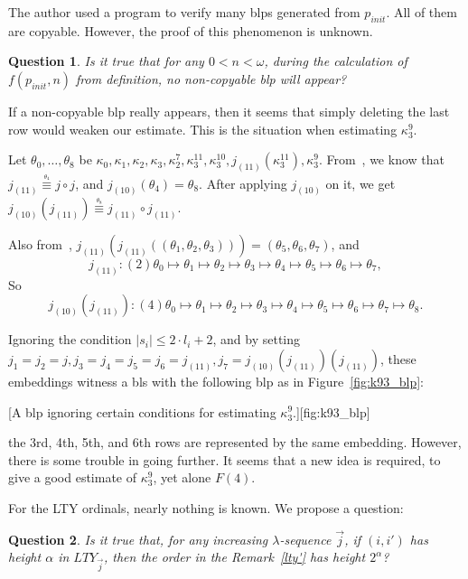 \documentclass{article}
\newtheorem{question}{Question}
\theoremstyle{definition}
\theoremstyle{remark}
\begin{document}
The author used a program to verify many blps generated from $p_{init}$. All of them are copyable. However, the proof of this phenomenon is unknown.

\begin{question}
    Is it true that for any $0<n<\omega$, during the calculation of $f(p_{init},n)$ from definition, no non-copyable blp will appear?
\end{question}

If a non-copyable blp really appears, then it seems that simply deleting the last row would weaken our estimate. This is the situation when estimating $\kappa^9_3$.

Let $\theta_0,\dots,\theta_8$ be $\kappa_0,\kappa_1,\kappa_2,\kappa_3,\kappa^7_2,\kappa^{11}_{3},\kappa^{10}_{3},j_{(11)}(\kappa^{11}_3),\kappa^9_3$. From~\cite{Dougherty}, we know that $j_{(11)}\overset{\underset{\theta_4}{}}{\equiv} j\circ j$, and $j_{(10)}(\theta_4)=\theta_8$. After applying $j_{(10)}$ on it, we get $j_{(10)}(j_{(11)})\overset{\underset{\theta_8}{}}{\equiv} j_{(11)}\circ j_{(11)}$.

Also from~\cite{Dougherty}, $j_{(11)}(j_{(11)}((\theta_1,\theta_2,\theta_3)))=(\theta_5,\theta_6,\theta_7)$, and 
 \[
 j_{(11)}:(2)\theta_0\mapsto\theta_1\mapsto\theta_2\mapsto\theta_3\mapsto\theta_4\mapsto\theta_5\mapsto\theta_6\mapsto\theta_7,
 \]
 So
  \[
 j_{(10)}(j_{(11)}):(4)\theta_0\mapsto\theta_1\mapsto\theta_2\mapsto\theta_3\mapsto\theta_4\mapsto\theta_5\mapsto\theta_6\mapsto\theta_7\mapsto\theta_8.
 \]

Ignoring the condition $|s_i|\le 2\cdot l_i+2$, and by setting $j_1=j_2=j, j_3=j_4=j_5=j_6=j_{(11)}, j_7=j_{(10)}(j_{(11)})(j_{(11)})$, these embeddings witness a bls with the following blp as in Figure~\ref{fig:k93_blp}:

[A blp ignoring certain conditions for estimating $\kappa^9_3$.][fig:k93_blp]

the 3rd, 4th, 5th, and 6th rows are represented by the same embedding. However, there is some trouble in going further. It seems that a new idea is required, to give a good estimate of $\kappa^9_3$, yet alone $F(4)$.

\smallskip

For the LTY ordinals, nearly nothing is known. We propose a question:

\begin{question} 
    Is it true that, for any increasing $\lambda$-sequence $\vec{j}$, if $(i,i')$ has height $\alpha$ in $LTY_{\vec{j}}$, then the order in the Remark~\ref{lty'} has height $2^\alpha$?
\end{question}
\end{document}
